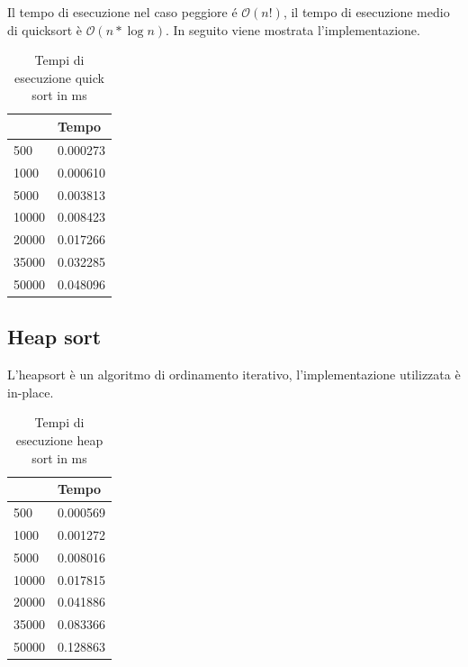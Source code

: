 \documentclass[12pt, a4paper]{report}
\begin{document}
Il tempo di esecuzione nel caso peggiore \'e $\mathcal{O}(n!) $, il tempo di esecuzione medio di quicksort è $\mathcal{O}(n * \log{}n) $. In seguito viene mostrata l'implementazione.

	

\begin{table}[ht]
\centering
\begin{tabular}{| l | l |}
\hline
 & Tempo \\ \hline
500 & 0.000273 \\ \hline
1000 & 0.000610 \\ \hline
5000 & 0.003813 \\ \hline
10000 & 0.008423 \\ \hline
20000 & 0.017266 \\ \hline
35000 & 0.032285 \\ \hline
50000 & 0.048096 \\ \hline

\end{tabular}
\caption{Tempi di esecuzione quick sort in ms}
\label{Tab:Tempi esecuzione QuickSort}
\end{table}

\subsection{Heap sort}
L'heapsort è un algoritmo di ordinamento iterativo, l'implementazione utilizzata è in-place.

	

\begin{table}[ht]
\centering
\begin{tabular}{| l | l |}
\hline
 & Tempo \\ \hline
500 & 0.000569 \\ \hline
1000 & 0.001272 \\ \hline
5000 & 0.008016 \\ \hline
10000 & 0.017815 \\ \hline
20000 & 0.041886 \\ \hline
35000 & 0.083366 \\ \hline
50000 & 0.128863 \\ \hline

\end{tabular}
\caption{Tempi di esecuzione heap sort in ms}
\label{Tab:Tempi esecuzione HeapSort}
\end{table}
\end{document}
